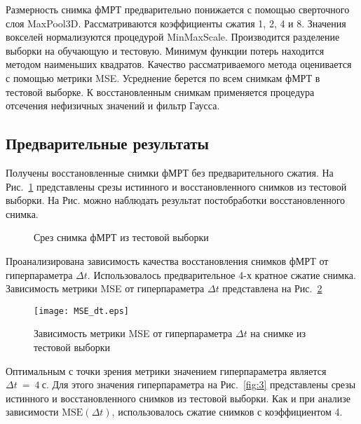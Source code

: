 \documentclass[a4paper, 12pt]{article}
\begin{document}
	Размерность снимка фМРТ предварительно понижается с помощью сверточного слоя MaxPool3D.
	Рассматриваются коэффициенты сжатия 1, 2, 4 и 8.
	Значения вокселей нормализуются процедурой MinMaxScale.
	Производится разделение выборки на обучающую и тестовую.
	Минимум функции потерь находится методом наименьших квадратов.
	Качество рассматриваемого метода оценивается с помощью метрики MSE.
	Усреднение берется по всем снимкам фМРТ в тестовой выборке.
	К восстановленным снимкам применяется процедура отсечения нефизичных значений
	и фильтр Гаусса.

\subsection{Предварительные результаты}

	Получены восстановленные снимки фМРТ без предварительного сжатия. 
	На Рис.~\ref*{fig:1} представлены срезы истинного и восстановленного снимков из 
	тестовой выборки. На Рис. можно наблюдать результат 
	постобработки восстановленного снимка.

	\begin{figure}[h!]
		\centering
		\hfill
		\hfill
		\caption{Срез снимка фМРТ из тестовой выборки}
		\label{fig:1}
	\end{figure}

	Проанализирована зависимость качества восстановления снимков фМРТ от гиперпараметра $\Delta t$.
	Использовалось предварительное 4-х кратное сжатие снимка.
	Зависимость метрики MSE от гиперпараметра $\Delta t$ представлена на Рис.~\ref{fig:2}

	\begin{figure}[h!]
		\centering
		\texttt{[image: MSE\_dt.eps]}
		\caption{Зависимость метрики MSE от гиперпараметра $\Delta t$ на снимке из тестовой выборки}
		\label{fig:2}
	\end{figure}

	Оптимальным с точки зрения метрики значением гиперпараметра является $\Delta t~=~4~\text{с}$.
	Для этого значения гиперпараметра на Рис.~\ref{fig:3} представлены срезы истинного и 
	восстановленного снимков из тестовой выборки. Как и при анализе зависимости $\text{MSE}(\Delta t)$,
	использовалось сжатие снимков с коэффициентом 4.
\end{document}
